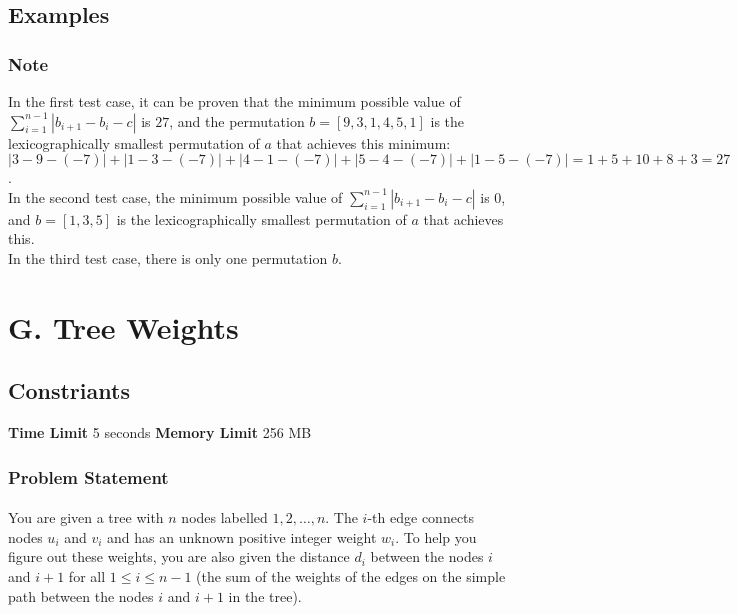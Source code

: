 \documentclass{article}
\begin{document}
\subsection*{Examples}
\subsubsection*{Note}In the first test case, it can be proven that the minimum possible value of $\sum\limits_{i=1}^{n-1} |b_{i+1}-b_i-c|$ is $27$, and the permutation $b = [9,3,1,4,5,1]$ is the lexicographically smallest permutation of $a$ that achieves this minimum: $|3-9-(-7)|+|1-3-(-7)|+|4-1-(-7)|+|5-4-(-7)|+|1-5-(-7)| = 1+5+10+8+3 = 27$.\\ In the second test case, the minimum possible value of $\sum\limits_{i=1}^{n-1} |b_{i+1}-b_i-c|$ is $0$, and $b = [1,3,5]$ is the lexicographically smallest permutation of $a$ that achieves this.\\ In the third test case, there is only one permutation $b$.
\newpage
\section*{G. Tree Weights}
\subsection*{Constriants}
\textbf{Time Limit}
5 seconds
\hfill
\textbf{Memory Limit}
256 MB
\subsubsection*{Problem Statement}
\paragraph{}You are given a tree with $n$ nodes labelled $1,2,\dots,n$. The $i$-th edge connects nodes $u_i$ and $v_i$ and has an unknown positive integer weight $w_i$. To help you figure out these weights, you are also given the distance $d_i$ between the nodes $i$ and $i+1$ for all $1 \le i \le n-1$ (the sum of the weights of the edges on the simple path between the nodes $i$ and $i+1$ in the tree).
\end{document}
